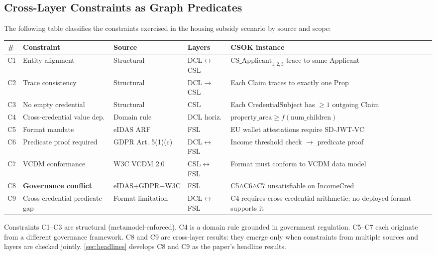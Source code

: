 \subsection{Cross-Layer Constraints as Graph Predicates}\label{cross-layer-constraints-as-graph-predicates}

\label{sec:cross-layer}

The following table classifies the constraints exercised in the housing subsidy scenario by source and scope:

\begin{center}
\small
\setlength{\tabcolsep}{4pt}
\begin{tabularx}{\columnwidth}{LLLLL}
\toprule
\# & Constraint & Source & Layers & CSOK instance \\
\midrule
C1 & Entity alignment & Structural & DCL\(\leftrightarrow\)CSL & \(\text{CS\_Applicant}_{1,2,3}\) trace to same Applicant \\
C2 & Trace consistency & Structural & DCL\(\rightarrow\)CSL & Each Claim traces to exactly one Prop \\
C3 & No empty credential & Structural & CSL & Each CredentialSubject has \(\geq 1\) outgoing Claim \\
C4 & Cross-credential value dep. & Domain rule & DCL horiz. & \(\text{property\_area} \geq f(\text{num\_children})\) \\
C5 & Format mandate & eIDAS ARF & FSL & EU wallet attestations require SD-JWT-VC \\
C6 & Predicate proof required & GDPR Art. 5(1)(c) & DCL\(\leftrightarrow\)FSL & Income threshold check \(\rightarrow\) predicate proof \\
C7 & VCDM conformance & W3C VCDM 2.0 & CSL\(\leftrightarrow\)FSL & Format must conform to VCDM data model \\
C8 & \textbf{Governance conflict} & eIDAS+GDPR+W3C & FSL & C5\(\wedge\)C6\(\wedge\)C7 unsatisfiable on IncomeCred \\
C9 & Cross-credential predicate gap & Format limitation & DCL\(\leftrightarrow\)FSL & C4 requires cross-credential arithmetic; no deployed format supports it \\
\bottomrule
\end{tabularx}
\end{center}


Constraints C1--C3 are structural (metamodel-enforced). C4 is a domain rule grounded in government regulation. C5--C7 each originate from a different governance framework. C8 and C9 are cross-layer results: they emerge only when constraints from multiple sources and layers are checked jointly. \autoref{sec:headlines} develops C8 and C9 as the paper's headline results.

